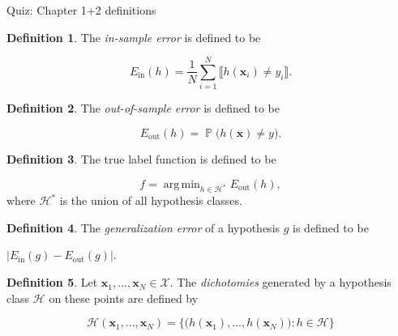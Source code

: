 \documentclass[10pt]{exam}
\theoremstyle{definition}
\newtheorem{defn}{Definition}
\DeclareMathOperator{\prob}{\mathbb P}
\DeclareMathOperator*{\argmin}{arg\,min}
\newcommand{\Ein}{E_{\text{in}}}
\newcommand{\Eout}{E_{\text{out}}}
\newcommand{\x}{\mathbf x}
\begin{document}
\begin{center}
{
\Huge
Quiz: Chapter 1+2 definitions
}
\end{center}

\begin{center}
\end{center}

\begin{defn}
    The \emph{in-sample error} is defined to be
    \begin{solutionorbox}[1in]
    \begin{equation*}
        \Ein(h) = \frac1N \sum_{i=1}^N \llbracket h(\x_i) \ne y_i \rrbracket
        .
    \end{equation*}
    \end{solutionorbox}
\end{defn}

\begin{defn}
    The \emph{out-of-sample error} is defined to be
    \begin{solutionorbox}[1in]
    \begin{equation*}
        \Eout(h) = \prob\big(h(\x) \ne y\big)
        .
    \end{equation*}
    \end{solutionorbox}
\end{defn}

\begin{defn}
    The true label function is defined to be
    \begin{solutionorbox}[1in]
    \begin{equation*}
        f = \argmin_{h \in \mathcal H^*} \Eout(h),
    \end{equation*}
    where $\mathcal H^*$ is the union of all hypothesis classes.
    \end{solutionorbox}
\end{defn}

\begin{defn}
    The \emph{generalization error} of a hypothesis $g$ is defined to be
    \begin{solutionorbox}[1in]
    $|\Ein(g) - \Eout(g)|$.
    \end{solutionorbox}
\end{defn}

\begin{defn}
    Let $\x_1,...,\x_N \in \mathcal X$.
    The \emph{dichotomies} generated by a hypothesis class $\mathcal H$ on these points are defined by
    \begin{solutionorbox}[1in]
    \begin{equation*}
        \mathcal H(\x_1, ..., \x_N) = \bigg\{ \big(h(\x_1), ..., h(\x_N)\big) : h \in \mathcal H \bigg\}
    \end{equation*}
    \end{solutionorbox}
\end{defn}
\end{document}
